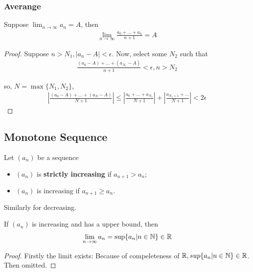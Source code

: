 \documentclass[Total.tex]{subfiles}
\begin{document}
			\subsubsection{Averange}
			
			\begin{proposition}
				Suppose $\lim_{n\rightarrow \infty} a_n=A$, then
				\begin{gather*}
					\lim_{n\rightarrow \infty} \frac{a_0+\dots+a_n}{n+1}=A
				\end{gather*}
			\end{proposition}
			\begin{proof}
				Suppose $n>N_1,|a_n-A|<\epsilon$. Now, select some $N_2$ such that 
				\begin{gather*}
					\frac{(a_0-A)+\dots+(a_{N_1}-A)}{n+1}<\epsilon,n>N_2
				\end{gather*}
				
				so, $N=\max\{N_1,N_2\}$,
				\begin{gather*}
					|\frac{(a_0-A)+\dots+(a_N-A)}{N+1}|\leq |\frac{a_0+\dots+a_{N_1}}{N+1}|+|\frac{a_{N_1+1}+\dots}{N+1}|<2\epsilon
				\end{gather*}
			\end{proof}
			
			\subsection{Monotone Sequence}
			\begin{Def} Let $(a_n)$ be a sequence
				\begin{itemize}
					\item $(a_n)$ is \textbf{strictly increasing} if $a_{n+1}>a_n$;
					\item $(a_n)$ is increasing if $a_{n+1}\geq a_n$.
				\end{itemize}
				
				Similarly for decreasing.
			\end{Def}
			
			\begin{proposition}
				If $(a_n)$ is increasing and has a upper bound, then 
				\begin{gather*}
					\lim_{n\rightarrow \infty} a_n=\sup\{a_n|n\in \mathbb{N}\}\in \mathbb{R}
				\end{gather*}
			\end{proposition}
			\begin{proof}
				Firstly the limit exists: Because of compeleteness of $\mathbb{R},sup\{a_n|n\in \mathbb{N}\}\in \mathbb{R}$. Then omitted.
			\end{proof}
			
\end{document}
